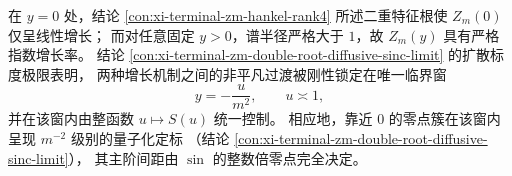 \begin{conclusion}[\texorpdfstring{$y=0$}{y=0} 的临界窗宽为 \texorpdfstring{$m^{-2}$}{m^{-2}}：线性增长与指数增长之间的唯一尺度]\label{con:xi-terminal-zm-critical-window-m2}
在 \(y=0\) 处，结论 \ref{con:xi-terminal-zm-hankel-rank4} 所述二重特征根使 \(Z_m(0)\) 仅呈线性增长；
而对任意固定 \(y>0\)，谱半径严格大于 \(1\)，故 \(Z_m(y)\) 具有严格指数增长率。
结论 \ref{con:xi-terminal-zm-double-root-diffusive-sinc-limit} 的扩散标度极限表明，
两种增长机制之间的非平凡过渡被刚性锁定在唯一临界窗
\[
y=-\frac{u}{m^{2}},
\qquad
u\asymp 1,
\]
并在该窗内由整函数 \(u\mapsto S(u)\) 统一控制。
相应地，靠近 \(0\) 的零点簇在该窗内呈现 \(m^{-2}\) 级别的量子化定标
（结论 \ref{con:xi-terminal-zm-double-root-diffusive-sinc-limit}），
其主阶间距由 \(\sin\) 的整数倍零点完全决定。
\end{conclusion}

